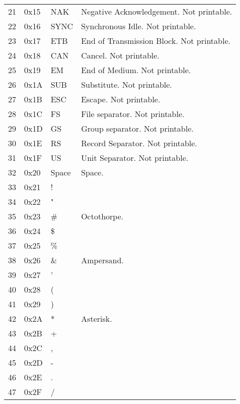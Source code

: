 \documentclass[11pt,fleqn]{book} %
\begin{document}
{\begin{table}[]
\begin{tabular}{|l|l|l|l|}
21            & 0x15      & NAK       & Negative Acknowledgement.  Not printable. \\
22            & 0x16      & SYNC      & Synchronous Idle.  Not printable. \\
23            & 0x17      & ETB       & End of Transmission Block.  Not printable. \\
24            & 0x18      & CAN       & Cancel.  Not printable. \\
25            & 0x19      & EM        & End of Medium.  Not printable.\\
26            & 0x1A      & SUB       & Substitute. Not printable. \\
27            & 0x1B      & ESC       & Escape.  Not printable. \\
28            & 0x1C      & FS        & File separator.  Not printable. \\
29            & 0x1D      & GS        & Group separator.  Not printable. \\
30            & 0x1E      & RS        & Record Separator.  Not printable. \\
31            & 0x1F      & US        & Unit Separator.  Not printable. \\
32            & 0x20      & Space     & Space. \\
33            & 0x21      & !         & \\
34            & 0x22      & "         & \\
35            & 0x23      & \#         & Octothorpe. \\
36            & 0x24      & \$         & \\
37            & 0x25      & \%         & \\
38            & 0x26      & \&         & Ampersand. \\
39            & 0x27      & '          & \\
40            & 0x28      & (          & \\
41            & 0x29      & )          & \\
42            & 0x2A      & *          & Asterisk. \\
43            & 0x2B      & +          & \\
44            & 0x2C      & ,          & \\
45            & 0x2D      & -          & \\
46            & 0x2E      & .          & \\
47            & 0x2F      & /          & \\
\hline


\end{tabular}
\end{table}}
\end{document}
